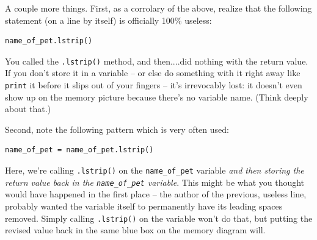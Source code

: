 A couple more things. First, as a corrolary of the above, realize that the
following statement (on a line by itself) is officially 100\% useless:

\begin{Verbatim}[fontsize=\small,samepage=true,frame=single,framesep=3mm]
name_of_pet.lstrip()
\end{Verbatim}

You called the \texttt{.lstrip()} method, and then....did nothing with the
return value. If you don't store it in a variable -- or else do something with
it right away like \texttt{print} it before it slips out of your fingers --
it's irrevocably lost: it doesn't even show up on the memory picture because
there's no variable name. (Think deeply about that.)

Second, note the following pattern which is very often used:

\begin{Verbatim}[fontsize=\small,samepage=true,frame=single,framesep=3mm]
name_of_pet = name_of_pet.lstrip()
\end{Verbatim}

Here, we're calling \texttt{.lstrip()} on the \texttt{name\_of\_pet} variable
\textit{and then storing the return value back in the \texttt{name\_of\_pet}
variable}. This might be what you thought would have happened in the first
place -- the author of the previous, useless line, probably wanted the variable
itself to permanently have its leading spaces removed. Simply calling
\texttt{.lstrip()} on the variable won't do that, but putting the revised value
back in the same blue box on the memory diagram will.
